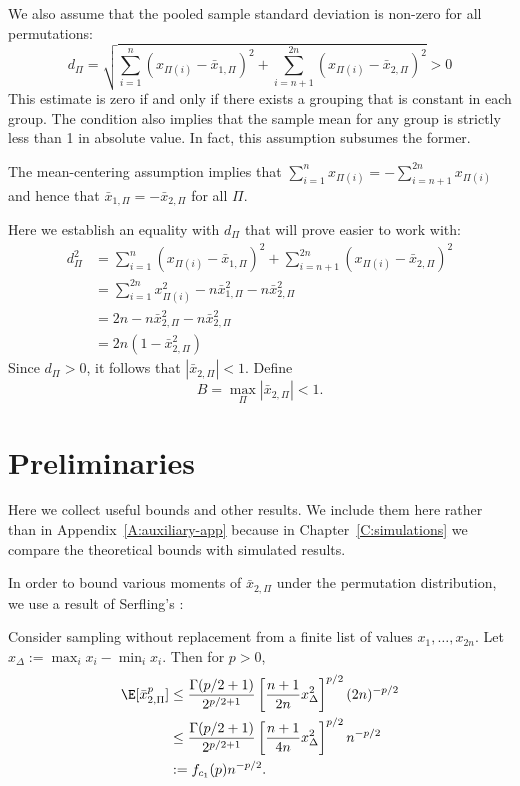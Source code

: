 We also assume that the pooled sample standard deviation is non-zero
for all permutations:
\begin{equation}
  \label{A:non-zero-std-dev}
  d_\Pi = \sqrt{\sum_{i=1}^n(x_{\Pi(i)} - \bar{x}_{1,\Pi})^2 +
    \sum_{i=n+1}^{2n}(x_{\Pi(i)} - \bar{x}_{2,\Pi})^2} > 0
\end{equation}
This estimate is zero if and only if there exists a grouping that is
constant in each group.  The condition also implies that the sample
mean for any group is strictly less than 1 in absolute value.  In
fact, this assumption subsumes the former.

The mean-centering assumption implies that
$\sum_{i=1}^{n} x_{\Pi(i)} = - \sum_{i=n+1}^{2n} x_{\Pi(i)}$
and hence that $\bar{x}_{1,\Pi} = -\bar{x}_{2,\Pi}$ for all $\Pi$.

Here we establish an equality with $d_{\Pi}$ that will prove easier to work with:
\begin{align*}
  d_\Pi^2 &=  \sum_{i=1}^n(x_{\Pi(i)} - \bar{x}_{1,\Pi})^2 +
  \sum_{i=n+1}^{2n}(x_{\Pi(i)} - \bar{x}_{2,\Pi})^2 \\
  &= \sum_{i=1}^{2n} x_{\Pi(i)}^2 - n \bar{x}_{1,\Pi}^2 - n \bar{x}_{2,\Pi}^2 \\
  &= 2n - n \bar{x}_{2,\Pi}^2 - n \bar{x}_{2,\Pi}^2 \\
  &= 2n(1 - \bar{x}_{2,\Pi}^2)
\end{align*}
Since $d_\Pi > 0$, it follows that $|\bar{x}_{2,\Pi}| < 1$.  Define
\begin{equation}
  \label{Assumption:B}
  B = \max_\Pi |\bar{x}_{2,\Pi}| < 1.
\end{equation}

\section{Preliminaries}
\label{S:stein-proof-preliminaries}
Here we collect useful bounds and other results.  We include them here rather than
in Appendix~\ref{A:auxiliary-app} because in Chapter~\ref{C:simulations} we compare
the theoretical bounds with simulated results.

In order to bound various moments of $\bar{x}_{2,\Pi}$ under the
permutation distribution, we use a result of Serfling's
\cite{serfling1974probability}:
\begin{proposition}
  Consider sampling without replacement from a finite list of values
  $x_1, \ldots, x_{2n}$.  Let $x_{\Delta} := \max_i x_{i} - \min_i
  x_{i}$.
  Then for $p > 0$,
  \begin{align}
    \E [\bar{x}_{2,\Pi}^p]
    &\leq \frac{\Gamma(p/2 + 1)}{2^{p/2 + 1}}
    \left [ \frac{n+1}{2n}x_{\Delta}^2 \right ]^{p/2}
    (2n)^{-p/2} \nonumber \\
    &\leq \frac{\Gamma(p/2 + 1)}{2^{p/2 + 1}}
    \left [ \frac{n+1}{4n}x_{\Delta}^2 \right ]^{p/2}
    n^{-p/2} \nonumber \\
    &:= f_{c_1}(p)n^{-p/2} \label{def:serfling}.
  \end{align}
\end{proposition}

